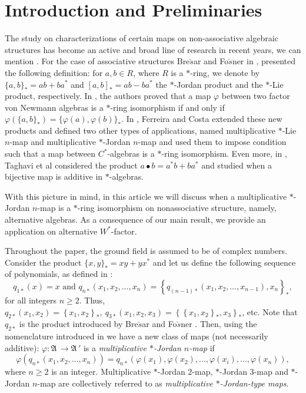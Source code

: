 \documentclass{amsart}
\def\A{{\mathfrak A}\, }
\begin{document}
\maketitle





\section{Introduction and Preliminaries}
The study on characterizations of certain maps on non-associative algebraic structures has become an active and broad line of research in recent years, we can mention \cite{chang, Fer3, Fer, bruth, Fer1, Fer2, Fer4, FerGur1}.
For the case of associative structures Bre$\check{s}$ar and Fo$\check{s}$ner in \cite{brefos1, brefos2}, presented the following definition: for $a, b \in R$, where $R$ is a $*$-ring, we denote by $\{a,b\}_* = ab+ba^{*}$ and $[a, b]_{*} = ab-ba^{*}$ the $*$-Jordan product and the $*$-Lie product, respectively. In \cite{LiLuFang}, the authors proved that a map $\varphi$ between two factor von Newmann algebras is a $*$-ring isomorphism if and only if $\varphi(\{a,b\}_*) = \{\varphi(a), \varphi(b)\}_*$. In \cite{Ferco}, Ferreira and Costa extended these new products and defined two other types of applications, named multiplicative $*$-Lie $n$-map and multiplicative $*$-Jordan $n$-map and used them to impose condition such that a map between $C^*$-algebras is a $*$-ring isomorphism. Even more, in \cite{Taghavi}, Taghavi et al considered the product $a \bullet b = a^*b+ba^*$ and studied when a bijective map is additive in $*$-algebras.





With this picture in mind, in this article we will discuss when a multiplicative $*$-Jordan $n$-map is a $*$-ring isomorphism on nonassociative structure, namely, alternative algebras. As a consequence of our main result, we provide an application on alternative $W^{*}$-factor.

Throughout the paper, the ground field is assumed to be of complex numbers. Consider the product $\{ x, y\}_* = xy + yx^*$ and let us define the following sequence of polynomials, as defined in \cite{Ferco}: 
$$q_{1*}(x) = x\, \,  \text{and}\, \,  q_{n*}(x_1, x_2, \ldots , x_n) = \left\{q_{(n-1)*}(x_1, x_2, \ldots , x_{n-1}) , x_n\right\}_{*},$$
for all integers $n \geq 2$. Thus, $q_{2*}(x_1, x_2) = \left\{x_1, x_2\right\}_{*}, \ q_{3*} (x_1, x_2, x_3) = \left\{\left\{x_1, x_2\right\}_{*} , x_3\right\}_{*}$, etc. Note that $q_{2*}$ is the product introduced by Bre$\check{s}$ar and Fo$\check{s}$ner \cite{brefos1, brefos2}. Then, using the nomenclature introduced in \cite{Ferco} we have a new class of maps (not necessarily additive): $\varphi : \A \longrightarrow \A'$ is a \textit{multiplicative $*$-Jordan $n$-map} if
\[
\varphi(q_{n*} (x_1, x_2, . . . ,x_n)) =  q_{n*} (\varphi(x_1), \varphi(x_2), . . . , \varphi(x_i), . . .,\varphi(x_n)),
\]
where $n \geq 2$ is an integer.
Multiplicative $*$-Jordan $2$-map, $*$-Jordan $3$-map 
and $*$-Jordan $n$-map are collectively referred to as \textit{multiplicative $*$-Jordan-type maps}.
\end{document}
